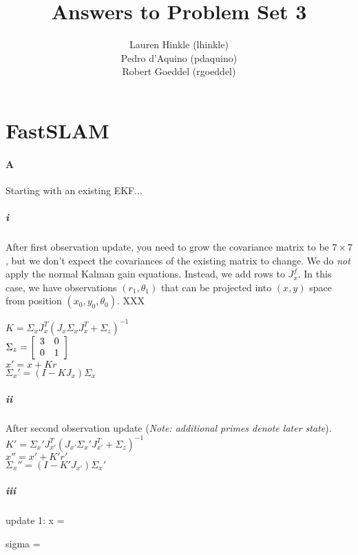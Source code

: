 \documentclass[12pt]{article}
\title{Answers to Problem Set 3}
\author{
	Lauren Hinkle (lhinkle)\\
	Pedro d'Aquino (pdaquino)\\
	Robert Goeddel (rgoeddel)}
\begin{document}
\maketitle
\pagebreak

\section{FastSLAM}

\paragraph{A}
Starting with an existing EKF...
\subparagraph{i}
After first observation update, you need to grow the covariance matrix to
be $7 \times 7$, but we don't expect the covariances of the existing matrix
to change. We do \emph{not} apply the normal Kalman gain equations. Instead,
we add rows to $J_x^f$. %
In this case, we have observations $(r_1, \theta_1)$ that can be projected
into $(x,y)$ space from position $(x_0, y_0, \theta_0)$.
XXX %

$K = \Sigma_x J_x^T(J_x \Sigma_x J_x^T + \Sigma_z)^{-1} $ \\
$\Sigma_z = \left[ \begin{array}{c c}
3 & 0 \\
0 & 1 \\
\end{array} \right]$ \\
$x' = x + Kr$ \\
$\Sigma_x' = (I - KJ_x) \Sigma_x$ \\

\subparagraph{ii}
After second observation update (\emph{Note: additional primes denote
    later state}).
$K' = \Sigma_x' J_{x'}^T(J_{x'} \Sigma_x' J_{x'}^T + \Sigma_z)^{-1} $ \\
$x'' = x' + K'r'$ \\
$\Sigma_x'' = (I - K'J_{x'}) \Sigma_x'$ \\

\subparagraph{iii}

update 1:
x =

sigma = 
\end{document}
